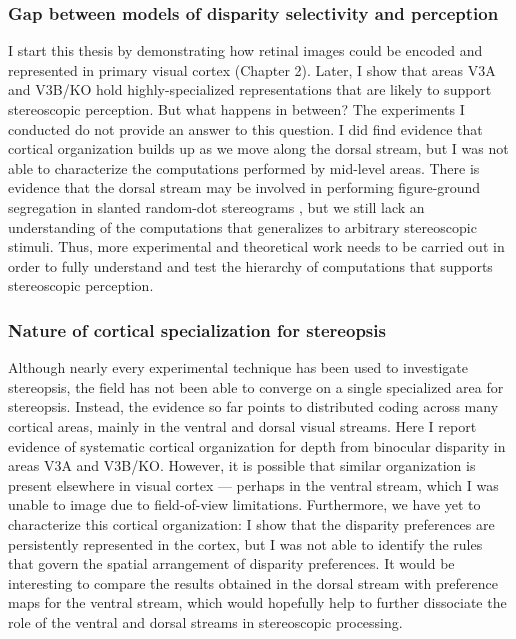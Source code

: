 \subsubsection*{Gap between models of disparity selectivity and perception}

I start this thesis by demonstrating how retinal images could be encoded and represented in primary visual cortex (Chapter 2). Later, I show that areas V3A and V3B/KO hold highly-specialized representations that are likely to support stereoscopic perception. But what happens in between? The experiments I conducted do not provide an answer to this question. I did find evidence that cortical organization builds up as we move along the dorsal stream, but I was not able to characterize the computations performed by mid-level areas. There is evidence that the dorsal stream may be involved in performing figure-ground segregation in slanted random-dot stereograms \cite{Ban:2015cr}, but we still lack an understanding of the computations that generalizes to arbitrary stereoscopic stimuli. Thus, more experimental and theoretical work needs to be carried out in order to fully understand and test the hierarchy of computations that supports stereoscopic perception. 

\subsubsection*{Nature of cortical specialization for stereopsis}

Although nearly every experimental technique has been used to investigate stereopsis, the field has not been able to converge on a single specialized area for stereopsis. Instead, the evidence so far points to distributed coding across many cortical areas, mainly in the ventral and dorsal visual streams. Here I report evidence of systematic cortical organization for depth from binocular disparity in areas V3A and V3B/KO. However, it is possible that similar organization is present elsewhere in visual cortex --- perhaps in the ventral stream, which I was unable to image due to field-of-view limitations. Furthermore, we have yet to characterize this cortical organization: I show that the disparity preferences are persistently represented in the cortex, but I was not able to identify the rules that govern the spatial arrangement of disparity preferences. It would be interesting to compare the results obtained in the dorsal stream with preference maps for the ventral stream, which would hopefully help to further dissociate the role of the ventral and dorsal streams in stereoscopic processing.

